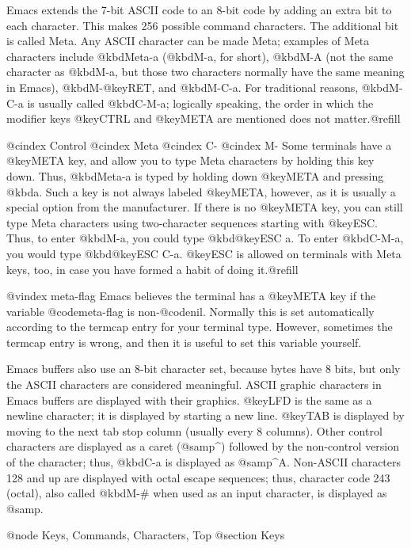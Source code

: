 {{  Emacs extends the 7-bit ASCII code to an 8-bit code by adding an extra
bit to each character.  This makes 256 possible command characters.  The
additional bit is called Meta.  Any ASCII character can be made Meta;
examples of Meta characters include @kbd{Meta-a} (@kbd{M-a}, for short),
@kbd{M-A} (not the same character as @kbd{M-a}, but those two characters
normally have the same meaning in Emacs), @kbd{M-@key{RET}}, and
@kbd{M-C-a}.  For traditional reasons, @kbd{M-C-a} is usually called
@kbd{C-M-a}; logically speaking, the order in which the modifier keys
@key{CTRL} and @key{META} are mentioned does not matter.@refill

@cindex Control
@cindex Meta
@cindex C-
@cindex M-
  Some terminals have a @key{META} key, and allow you to type Meta
characters by holding this key down.  Thus, @kbd{Meta-a} is typed by
holding down @key{META} and pressing @kbd{a}.  Such a key is not always
labeled @key{META}, however, as it is usually a special option from the
manufacturer.  If there is no @key{META} key, you can still type Meta
characters using two-character sequences starting with @key{ESC}.  Thus, to
enter @kbd{M-a}, you could type @kbd{@key{ESC} a}.  To enter @kbd{C-M-a},
you would type @kbd{@key{ESC} C-a}.  @key{ESC} is allowed on terminals with
Meta keys, too, in case you have formed a habit of doing it.@refill

@vindex meta-flag
  Emacs believes the terminal has a @key{META} key if the variable
@code{meta-flag} is non-@code{nil}.  Normally this is set automatically
according to the termcap entry for your terminal type.  However, sometimes
the termcap entry is wrong, and then it is useful to set this variable
yourself.

  Emacs buffers also use an 8-bit character set, because bytes have 8 bits,
but only the ASCII characters are considered meaningful.  ASCII graphic
characters in Emacs buffers are displayed with their graphics.  @key{LFD}
is the same as a newline character; it is displayed by starting a new line.
@key{TAB} is displayed by moving to the next tab stop column (usually every
8 columns).  Other control characters are displayed as a caret (@samp{^})
followed by the non-control version of the character; thus, @kbd{C-a} is
displayed as @samp{^A}.  Non-ASCII characters 128 and up are displayed with
octal escape sequences; thus, character code 243 (octal), also called
@kbd{M-#} when used as an input character, is displayed as @samp{}.

@node Keys, Commands, Characters, Top
@section Keys

}}
